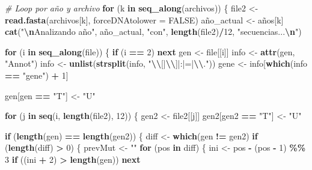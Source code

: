 \documentclass[
]{article}
\newenvironment{Shaded}{\begin{snugshade}}{\end{snugshade}}
\newcommand{\AttributeTok}[1]{\textcolor[rgb]{0.13,0.29,0.53}{#1}}
\newcommand{\CommentTok}[1]{\textcolor[rgb]{0.56,0.35,0.01}{\textit{#1}}}
\newcommand{\ConstantTok}[1]{\textcolor[rgb]{0.56,0.35,0.01}{#1}}
\newcommand{\ControlFlowTok}[1]{\textcolor[rgb]{0.13,0.29,0.53}{\textbf{#1}}}
\newcommand{\DecValTok}[1]{\textcolor[rgb]{0.00,0.00,0.81}{#1}}
\newcommand{\FunctionTok}[1]{\textcolor[rgb]{0.13,0.29,0.53}{\textbf{#1}}}
\newcommand{\NormalTok}[1]{#1}
\newcommand{\OtherTok}[1]{\textcolor[rgb]{0.56,0.35,0.01}{#1}}
\newcommand{\SpecialCharTok}[1]{\textcolor[rgb]{0.81,0.36,0.00}{\textbf{#1}}}
\newcommand{\StringTok}[1]{\textcolor[rgb]{0.31,0.60,0.02}{#1}}
\begin{document}
\begin{Shaded}
\begin{Highlighting}[]
\CommentTok{\# Loop por año y archivo}
\ControlFlowTok{for}\NormalTok{ (k }\ControlFlowTok{in} \FunctionTok{seq\_along}\NormalTok{(archivos)) \{}
\NormalTok{  file2 }\OtherTok{\textless{}{-}} \FunctionTok{read.fasta}\NormalTok{(archivos[k], }\AttributeTok{forceDNAtolower =} \ConstantTok{FALSE}\NormalTok{)}
\NormalTok{  año\_actual }\OtherTok{\textless{}{-}}\NormalTok{ años[k]}
  \FunctionTok{cat}\NormalTok{(}\StringTok{"}\SpecialCharTok{\textbackslash{}n}\StringTok{Analizando año"}\NormalTok{, año\_actual, }\StringTok{"con"}\NormalTok{, }\FunctionTok{length}\NormalTok{(file2)}\SpecialCharTok{/}\DecValTok{12}\NormalTok{, }\StringTok{"secuencias...}\SpecialCharTok{\textbackslash{}n}\StringTok{"}\NormalTok{)}
  
  \ControlFlowTok{for}\NormalTok{ (i }\ControlFlowTok{in} \FunctionTok{seq\_along}\NormalTok{(file)) \{}
    \ControlFlowTok{if}\NormalTok{ (i }\SpecialCharTok{==} \DecValTok{2}\NormalTok{) }\ControlFlowTok{next}
\NormalTok{    gen }\OtherTok{\textless{}{-}}\NormalTok{ file[[i]]}
\NormalTok{    info }\OtherTok{\textless{}{-}} \FunctionTok{attr}\NormalTok{(gen, }\StringTok{"Annot"}\NormalTok{)}
\NormalTok{    info }\OtherTok{\textless{}{-}} \FunctionTok{unlist}\NormalTok{(}\FunctionTok{strsplit}\NormalTok{(info, }\StringTok{"}\SpecialCharTok{\textbackslash{}\textbackslash{}}\StringTok{[|}\SpecialCharTok{\textbackslash{}\textbackslash{}}\StringTok{]|:|=|}\SpecialCharTok{\textbackslash{}\textbackslash{}}\StringTok{."}\NormalTok{))  }
\NormalTok{    gene }\OtherTok{\textless{}{-}}\NormalTok{ info[}\FunctionTok{which}\NormalTok{(info }\SpecialCharTok{==} \StringTok{"gene"}\NormalTok{) }\SpecialCharTok{+} \DecValTok{1}\NormalTok{]}
    
\NormalTok{    gen[gen }\SpecialCharTok{==} \StringTok{"T"}\NormalTok{] }\OtherTok{\textless{}{-}} \StringTok{"U"}
    
    \ControlFlowTok{for}\NormalTok{ (j }\ControlFlowTok{in} \FunctionTok{seq}\NormalTok{(i, }\FunctionTok{length}\NormalTok{(file2), }\DecValTok{12}\NormalTok{)) \{}
\NormalTok{      gen2 }\OtherTok{\textless{}{-}}\NormalTok{ file2[[j]]}
\NormalTok{      gen2[gen2 }\SpecialCharTok{==} \StringTok{"T"}\NormalTok{] }\OtherTok{\textless{}{-}} \StringTok{"U"}
      
      \ControlFlowTok{if}\NormalTok{ (}\FunctionTok{length}\NormalTok{(gen) }\SpecialCharTok{==} \FunctionTok{length}\NormalTok{(gen2)) \{}
\NormalTok{        diff }\OtherTok{\textless{}{-}} \FunctionTok{which}\NormalTok{(gen }\SpecialCharTok{!=}\NormalTok{ gen2)}
        \ControlFlowTok{if}\NormalTok{ (}\FunctionTok{length}\NormalTok{(diff) }\SpecialCharTok{\textgreater{}} \DecValTok{0}\NormalTok{) \{}
\NormalTok{          prevMut }\OtherTok{\textless{}{-}} \StringTok{""}
          \ControlFlowTok{for}\NormalTok{ (pos }\ControlFlowTok{in}\NormalTok{ diff) \{}
\NormalTok{            ini }\OtherTok{\textless{}{-}}\NormalTok{ pos }\SpecialCharTok{{-}}\NormalTok{ (pos }\SpecialCharTok{{-}} \DecValTok{1}\NormalTok{) }\SpecialCharTok{\%\%} \DecValTok{3}
            \ControlFlowTok{if}\NormalTok{ ((ini }\SpecialCharTok{+} \DecValTok{2}\NormalTok{) }\SpecialCharTok{\textgreater{}} \FunctionTok{length}\NormalTok{(gen)) }\ControlFlowTok{next}
            

\end{Highlighting}
\end{Shaded}
\end{document}
